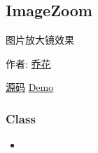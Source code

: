 \documentclass[letterpaper,10pt,english]{sphinxmanual}
\begin{document}
\label{api/component/imagezoom/index:module-ImageZoom}

\subsection{ImageZoom}
\label{api/component/imagezoom/index::doc}\label{api/component/imagezoom/index:imagezoom}
\begin{DUlineblock}{0em}
\item[] 图片放大镜效果
\item[] 作者: \href{mailto:qiaohua@taobao.com}{乔花}
\item[] \href{https://github.com/kissyteam/kissy/tree/master/src/imagezoom}{源码}  \textbar{} \href{http://docs.kissyui.com/kissy/src/imagezoom/demo.html}{Demo}
\end{DUlineblock}


\subsubsection{Class}
\label{api/component/imagezoom/index:class}\begin{itemize}
\item {}
{\hyperref[api/component/imagezoom/index:ImageZoom.ImageZoom]{}}

\end{itemize}
\end{document}
